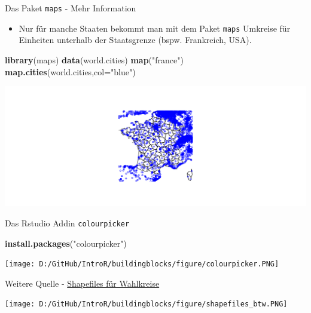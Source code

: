\documentclass[ignorenonframetext,]{beamer}
\newenvironment{Shaded}{\begin{snugshade}}{\end{snugshade}}
\newcommand{\DataTypeTok}[1]{\textcolor[rgb]{0.13,0.29,0.53}{#1}}
\newcommand{\KeywordTok}[1]{\textcolor[rgb]{0.13,0.29,0.53}{\textbf{#1}}}
\newcommand{\NormalTok}[1]{#1}
\newcommand{\StringTok}[1]{\textcolor[rgb]{0.31,0.60,0.02}{#1}}
\providecommand{\tightlist}{%
  \setlength{\itemsep}{0pt}\setlength{\parskip}{0pt}}
\begin{document}
\begin{frame}[fragile]{Das Paket \texttt{maps} - Mehr Information}
\protect\hypertarget{das-paket-maps---mehr-information}{}

\begin{itemize}
\tightlist
\item
  Nur für manche Staaten bekommt man mit dem Paket \texttt{maps}
  Umkreise für Einheiten unterhalb der Staatsgrenze (bspw. Frankreich,
  USA).
\end{itemize}

\begin{Shaded}
\begin{Highlighting}[]
\KeywordTok{library}\NormalTok{(maps)}
\KeywordTok{data}\NormalTok{(world.cities)}
\KeywordTok{map}\NormalTok{(}\StringTok{"france"}\NormalTok{)}
\KeywordTok{map.cities}\NormalTok{(world.cities,}\DataTypeTok{col=}\StringTok{"blue"}\NormalTok{)}
\end{Highlighting}
\end{Shaded}

\includegraphics{shapefiles_files/figure-beamer/unnamed-chunk-44-1.pdf}

\end{frame}

\begin{frame}[fragile]{Das Rstudio Addin \texttt{colourpicker}}
\protect\hypertarget{das-rstudio-addin-colourpicker}{}

\begin{Shaded}
\begin{Highlighting}[]
\KeywordTok{install.packages}\NormalTok{(}\StringTok{"colourpicker"}\NormalTok{)}
\end{Highlighting}
\end{Shaded}

\texttt{[image: D:/GitHub/IntroR/buildingblocks/figure/colourpicker.PNG]}

\end{frame}

\begin{frame}{Weitere Quelle -
\href{https://www.bundeswahlleiter.de/bundestagswahlen/2017/wahlkreiseinteilung/downloads.html}{Shapefiles
für Wahlkreise}}
\protect\hypertarget{weitere-quelle---shapefiles-fur-wahlkreise}{}

\texttt{[image: D:/GitHub/IntroR/buildingblocks/figure/shapefiles\_btw.PNG]}

\end{frame}
\end{document}
